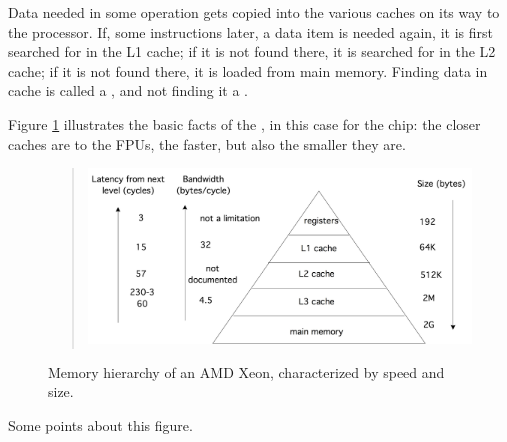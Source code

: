 Data needed in some operation gets copied into the various
caches on its way to the processor. If, some instructions later, a
data item is needed again, it is first searched for in the L1 cache; if it is
not found there, it is searched for in the L2 cache; if it is not found there,
it is loaded from main memory. Finding data in cache is called a
, and not finding it a .

Figure \ref{fig:hierarchy} illustrates the basic facts of the
, in
this case for the  chip: the
closer caches are to the \acp{FPU}, the faster, but also the
smaller they are.
\begin{figure}
  \begin{quote}
  \includegraphics[scale=.15]{graphics-public/hierarchy}
  \end{quote}
  \caption{Memory hierarchy of an AMD Xeon, characterized by speed and size.}
  \label{fig:hierarchy}
\end{figure}
Some points about this figure.
